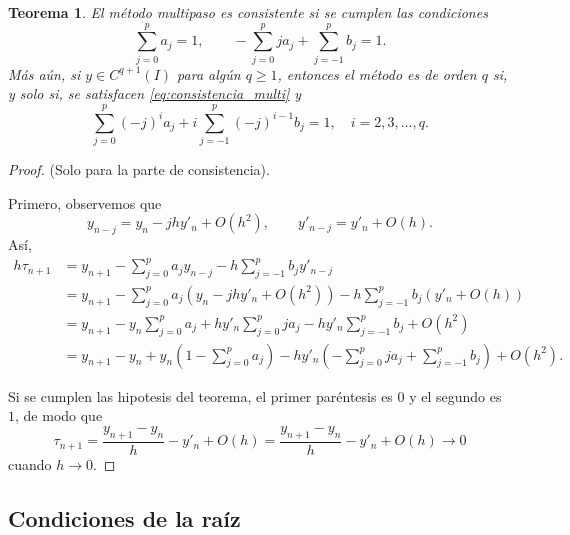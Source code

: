 \documentclass[11pt,letterpaper]{article}
\newtheorem{theorem}{Teorema}
\begin{document}
\begin{theorem}
  El método multipaso es consistente si se cumplen las condiciones
  \begin{equation}\label{eq:consistencia_multi}
    \sum_{j=0}^{p}a_j = 1,
    \qquad
    -\sum_{j=0}^{p}ja_j + \sum_{j=-1}^{p}b_j = 1.
  \end{equation}
  Más aún, si $y\in C^{q+1}(I)$ para algún $q\geq 1$, entonces el
  método es de orden $q$ si, y solo si, se satisfacen
  \eqref{eq:consistencia_multi} y
  \begin{equation}
    \sum_{j=0}^{p}(-j)^{i}a_j + i \sum_{j=-1}^{p}(-j)^{i-1}b_j = 1,
    \quad i=2,3,\dots,q
  .\end{equation}
\end{theorem}
\begin{proof}
  (Solo para la parte de consistencia).

  Primero, observemos que
  \begin{equation}
    y_{n-j} = y_{n} - jhy'_n + O(h^{2}),
    \qquad 
    y'_{n-j} = y'_n + O(h)
  .\end{equation}
  Así,
  \begin{align}
    h\tau_{n+1}
    &= y_{n+1}
    - \sum_{j=0}^{p}a_jy_{n-j}
    - h \sum_{j=-1}^{p}b_{j}y'_{n-j} \\
    &= y_{n+1}
    - \sum_{j=0}^{p}a_j(y_n - jhy'_n + O(h^{2}))
    - h \sum_{j=-1}^{p}b_{j}(y'_{n}+O(h)) \\
    &= y_{n+1}
    - y_n \sum_{j=0}^{p}a_j
    + hy'_n \sum_{j=0}^{p}ja_j
    - hy'_n \sum_{j=-1}^{p}b_{j} + O(h^{2})
    \\
    &= y_{n+1} - y_n
    + y_n\left(1-\sum_{j=0}^{p}a_j\right)
    - hy'_n
    \left( - \sum_{j=0}^{p}ja_j + \sum_{j=-1}^{p}b_{j} \right)
    + O(h^{2})
  .\end{align}
  
  Si se cumplen las hipotesis del teorema, el primer
  paréntesis es $0$ y el segundo es $1$, de modo que
  \begin{equation}
    \tau_{n+1}
    = \frac{y_{n+1} - y_n}{h} - y'_n + O(h)
    = \frac{y_{n+1} - y_n}{h} - y'_n + O(h)
    \to 0
  \end{equation}
  cuando $h\to 0$.
\end{proof}

\subsection{Condiciones de la raíz}
\end{document}

